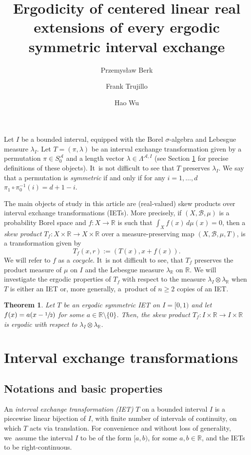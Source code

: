 \documentclass[10pt,a4paper]{amsart}
\theoremstyle{plain}
\newtheorem{theorem}{Theorem}[section]
\theoremstyle{definition}
\newcommand{\R}{\mathbb{R}}
\begin{document}
\title[Linear extensions of symmetric IETs]{Ergodicity of centered linear real extensions of every ergodic symmetric interval exchange}
\author{Przemysław Berk\and Frank Trujillo\and Hao Wu}
\date{}\maketitle\setcounter{section}{1}
Let $I$ be a bounded interval, equipped with the Borel $\sigma$-algebra and Lebesgue measure $\lambda_{I}$. Let $T=(\pi,\lambda)$ be an interval exchange transformation given by a permutation $\pi\in S_0^\mathcal A$ and a length vector $\lambda\in\Lambda^{\mathcal A,I}$
{(see Section \ref{sc:IETs} for precise definitions of these objects)}. It~is not difficult to see that $T$ preserves $\lambda_{I}$. We say that a permutation is \emph{symmetric} if and only if for any $i = 1, \dots, d$ $\pi_1\circ\pi_0^{-1}(i)=d+1-i$.

The main objects of study in this article are (real-valued) skew products over interval exchange transformations (IETs). More precisely, if $(X,\mathcal B,\mu)$ is a probability Borel space and $f:X\to \R$ is such that $\int_X f(x)\,d\mu(x)=0$, then a \emph{skew product} $T_f:X\times \R\to X\times \R$ over a measure-preserving map $(X,\mathcal B,\mu,T)$, is a transformation given by
\[
T_f(x,r):=(T(x),x+f(x)).
\]
We will refer to $f$ as a \emph{cocycle}. It~is not difficult to see, that $T_f$ preserves the product measure of $\mu$ on $I$ and the Lebesgue measure $\lambda_{\R}$ on $\R$. We will investigate the ergodic properties of $T_f$ with respect to the measure $\lambda_I\otimes\lambda_{\R}$ when $T$ is either an IET or, more generally, a~product of $n \ge 2$ copies of an IET.

\begin{theorem}\label{thm: ergo}
Let $T$ be an ergodic symmetric IET on $I = [0, 1)$ and let $f(x)=a(x-\sfrac{1}{2})$ for some $a\in\R\setminus\{0\}$. Then, the skew product $T_f:I\times\R\to I\times \R$ is ergodic with respect to $\lambda_I\otimes\lambda_{\R}$.
\end{theorem}
\section{Interval exchange transformations}
\label{sc:IETs}

\subsection{Notations and basic properties} An \emph{interval exchange transformation (IET)} $T$ on a bounded interval $I$ is a piecewise linear bijection of $I$, with finite number of intervals of continuity, on which $T$ acts via translation. {For convenience and without loss of generality, we~assume the interval $I$ to be of the form $[a, b)$, for some $a, b \in \R$, and the IETs to be right-continuous.}
\end{document}
